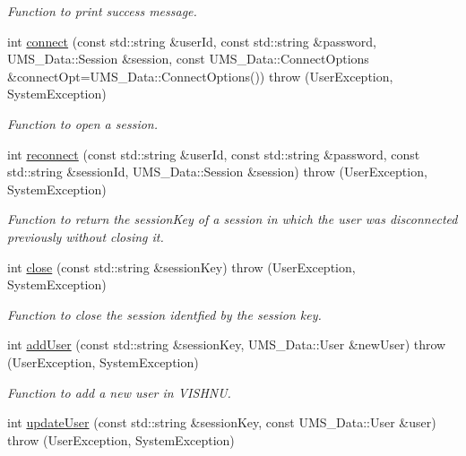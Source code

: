\begin{DoxyCompactItemize}
\begin{DoxyCompactList}\small\item\em Function to print success message. \item\end{DoxyCompactList}\item 
int \hyperlink{namespacevishnu_ac58b058a6a467a21f7eb21192617c90f}{connect} (const std::string \&userId, const std::string \&password, UMS\_\-Data::Session \&session, const UMS\_\-Data::ConnectOptions \&connectOpt=UMS\_\-Data::ConnectOptions())  throw (UserException, SystemException)
\begin{DoxyCompactList}\small\item\em Function to open a session. \item\end{DoxyCompactList}\item 
int \hyperlink{namespacevishnu_ae120231ba899d68724dc972374206745}{reconnect} (const std::string \&userId, const std::string \&password, const std::string \&sessionId, UMS\_\-Data::Session \&session)  throw (UserException, SystemException)
\begin{DoxyCompactList}\small\item\em Function to return the sessionKey of a session in which the user was disconnected previously without closing it. \item\end{DoxyCompactList}\item 
int \hyperlink{namespacevishnu_a925f5cdd60d012ebd98cd328ed60d398}{close} (const std::string \&sessionKey)  throw (UserException, SystemException)
\begin{DoxyCompactList}\small\item\em Function to close the session identfied by the session key. \item\end{DoxyCompactList}\item 
int \hyperlink{namespacevishnu_ac7cd83030f8f6e990001b238a9f50640}{addUser} (const std::string \&sessionKey, UMS\_\-Data::User \&newUser)  throw (UserException, SystemException)
\begin{DoxyCompactList}\small\item\em Function to add a new user in VISHNU. \item\end{DoxyCompactList}\item 
int \hyperlink{namespacevishnu_a1446b24fda1ed0ca910686635b6bb956}{updateUser} (const std::string \&sessionKey, const UMS\_\-Data::User \&user)  throw (UserException, SystemException)

\end{DoxyCompactItemize}
